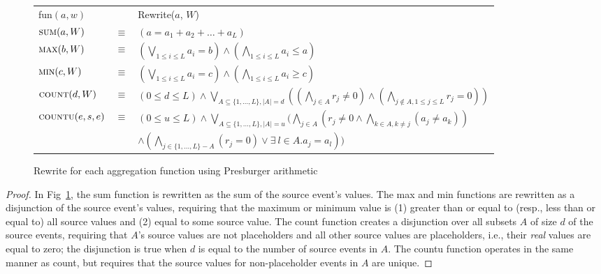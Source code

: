 \begin{figure}[h!]
\centering
\begin{tabular}{lcl}
{\sc fun}$(a,w)$      & & {\sf Rewrite}($a$, $W$) \\
$\mbox{\sc sum}(a,W)$ & $\equiv$ & $(a=a_1 + a_2 + \dots + a_{L})$ \\
$\mbox{\sc max}(b,W)$ & $\equiv$ & $(\displaystyle{\bigvee}_{1 \leq i \leq L} a_i = b) \land (\displaystyle{\bigwedge}_{1 \leq i \leq L} a_i \leq a)$ \\
$\mbox{\sc min}(c,W)$ & $\equiv$ & $(\displaystyle{\bigvee}_{1 \leq i \leq L} a_i = c) \land (\displaystyle{\bigwedge}_{1 \leq i \leq L} a_i \geq c)$ \\
$\mbox{\sc count}(d,W)$ & $\equiv$ & $(0 \leq d \leq L) \land \displaystyle{\bigvee}_{A \subseteq \{1,\dots,L\},|A|=d} ((\displaystyle{\bigwedge}_{j\in A} r_j {\neq} 0) \land (\displaystyle{\bigwedge}_{j\not\in A,1\leq j\leq L} r_j {=} 0))$\\
$\mbox{\sc countu}(e,s,e)$ & $\equiv$ & $(0 \leq u \leq L) \land \displaystyle{\bigvee}_{A \subseteq \{1,\dots,L\},|A|=u} (\displaystyle{\bigwedge}_{j\in A} (r_j {\neq} 0 \land \displaystyle{\bigwedge}_{k\in A, k \neq j}(a_j {\neq a_k}))$\\
                      &          & \hspace{1.5cm} $\land (\displaystyle{\bigwedge}_{j\in \{1,\dots,L\}-A} (r_j {=} 0) \lor \exists\ l\in A. a_j=a_l))$\\
\end{tabular}
\caption{{\sf Rewrite} for each aggregation function using Presburger arithmetic}
\label{fig:agg-rewriting}
\end{figure}

\begin{proof}
In Fig~\ref{fig:agg-rewriting},
the {\sc sum} function is rewritten as the sum of the source event's values.
The {\sc max} and {\sc min} functions are rewritten as a disjunction of the source event's values,
requiring that the maximum or minimum value is
(1) greater than or equal to (resp., less than or equal to) all source values
and (2) equal to some source value.
The {\sc count} function creates a disjunction over all subsets $A$ of size $d$ of the source events,
requiring that $A$'s source values are not placeholders and all other source values are placeholders,
i.e., their {\em real} values are equal to zero;
the disjunction is true when $d$ is equal to the number of source events in $A$.
The {\sc countu} function operates in the same manner as {\sc count},
but requires that the source values for non-placeholder events in $A$ are unique.
\end{proof}

